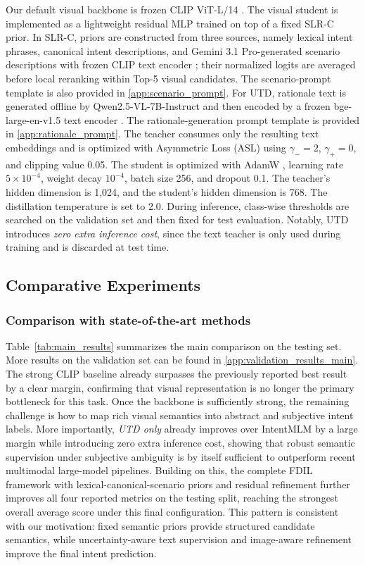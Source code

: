 Our default visual backbone is frozen CLIP ViT-L/14 \cite{radford_learning_2021}. The visual student is implemented as a lightweight residual MLP trained on top of a fixed SLR-C prior. In SLR-C, priors are constructed from three sources, namely lexical intent phrases, canonical intent descriptions, and Gemini 3.1 Pro-generated scenario descriptions \cite{team_gemini_2025} with frozen CLIP text encoder \cite{radford_learning_2021}; their normalized logits are averaged before local reranking within Top-5 visual candidates. The scenario-prompt template is also provided in \ref{app:scenario_prompt}. For UTD, rationale text is generated offline by Qwen2.5-VL-7B-Instruct \cite{bai_qwen25-vl_2025} and then encoded by a frozen bge-large-en-v1.5 text encoder \cite{xiao_c-pack_2024}. The rationale-generation prompt template is provided in \ref{app:rationale_prompt}. The teacher consumes only the resulting text embeddings and is optimized with Asymmetric Loss (ASL) \cite{ridnik_asymmetric_2021} using $\gamma_{-}=2$, $\gamma_{+}=0$, and clipping value 0.05. The student is optimized with AdamW \cite{loshchilov_decoupled_2018}, learning rate $5\times10^{-4}$, weight decay $10^{-4}$, batch size 256, and dropout 0.1. The teacher's hidden dimension is 1,024, and the student's hidden dimension is 768. The distillation temperature is set to 2.0. During inference, class-wise thresholds are searched on the validation set and then fixed for test evaluation. Notably, UTD introduces \emph{zero extra inference cost}, since the text teacher is only used during training and is discarded at test time.


\subsection{Comparative Experiments}

\subsubsection{Comparison with state-of-the-art methods}
Table~\ref{tab:main_results} summarizes the main comparison on the testing set.
More results on the validation set can be found in \ref{app:validation_results_main}.
The strong CLIP baseline already surpasses the previously reported best result by a clear margin, confirming that visual representation is no longer the primary bottleneck for this task. Once the backbone is sufficiently strong, the remaining challenge is how to map rich visual semantics into abstract and subjective intent labels. More importantly, \textit{UTD only} already improves over IntentMLM by a large margin while introducing zero extra inference cost, showing that robust semantic supervision under subjective ambiguity is by itself sufficient to outperform recent multimodal large-model pipelines. Building on this, the complete FDIL framework with lexical-canonical-scenario priors and residual refinement further improves all four reported metrics on the testing split, reaching the strongest overall average score under this final configuration. This pattern is consistent with our motivation: fixed semantic priors provide structured candidate semantics, while uncertainty-aware text supervision and image-aware refinement improve the final intent prediction.

